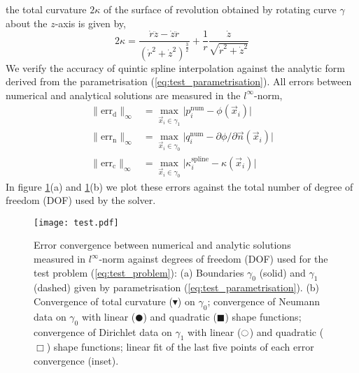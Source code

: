 \documentclass{jfm}
\begin{document}
the total curvature $2\kappa$ of the surface of revolution obtained by rotating curve $\gamma$
about the $z$-axis is given by,
\begin{equation}
2\kappa= \frac{\dot{r}\ddot{z} - \dot{z}\ddot{r}}{(\dot{r}^2+\dot{z}^2)^{\frac{3}{2}}}
+\frac{1}{r}\frac{\dot{z}}{\sqrt{\dot{r}^2+\dot{z}^2}}
\end{equation}
We verify the accuracy of quintic spline interpolation against the analytic form derived from
the parametrisation (\ref{eq:test_parametrisation}). All errors between numerical and analytical solutions
are measured in the $l^\infty$-norm,
\begin{align}
\|\textrm{err}_\mathrm{d}\|_\infty &= 
\max_{\vec{x}_i\in \gamma_1}{\lvert p^\mathrm{num}_i-\phi(\vec{x}_i)\rvert}\\
\|\textrm{err}_\mathrm{n}\|_\infty &= 
\max_{\vec{x}_i\in \gamma_0}{\lvert q^\mathrm{num}_i-\partial\phi/\partial\vec{n}(\vec{x}_i)\rvert}\\
\|\textrm{err}_\mathrm{c}\|_\infty &= 
\max_{\vec{x}_i\in \gamma_0}{\lvert \kappa^\mathrm{spline}_i-\kappa(\vec{x}_i)\rvert}
\end{align}
In figure \ref{fig:test_result}(a) and \ref{fig:test_result}(b) 
we plot these errors against the total number of degree of freedom (DOF) used by the solver.
\begin{figure}
  \centering
  \texttt{[image: test.pdf]}%
  \caption{
Error convergence  between numerical and analytic solutions measured in $l^\infty$-norm against degrees of freedom (DOF) used for the test problem (\ref{eq:test_problem}):
(a) Boundaries $\gamma_0$ (solid) and $\gamma_1$ (dashed) given by parametrisation (\ref{eq:test_parametrisation}).
(b) Convergence of total curvature ($\blacktriangledown$) on $\gamma_0$;
convergence of Neumann data on $\gamma_0$ with linear ($\CIRCLE $) and quadratic ($\blacksquare$) shape functions;
convergence of Dirichlet data on $\gamma_1$ with linear ($\ocircle $) and quadratic ($\Box$) shape functions;
linear fit of the last five points of each error convergence (inset).
  }
\label{fig:test_result}
\end{figure}
\end{document}
